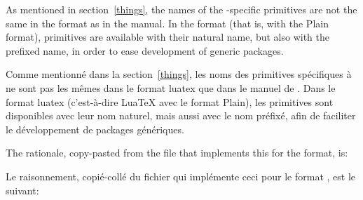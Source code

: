 \documentclass{lltxdoc}
\begin{document}
{
As mentioned in section~\ref{things}, the names of the \luatex-specific
primitives are not the same in the  format as in the \luatex
manual. In the  format (that is, \luatex with the Plain format),
primitives are available with their natural name, but also with the prefixed
name, in order to ease development of generic packages.

Comme mentionné dans la section~\ref{things}, les noms des primitives spécifiques à \luatex ne sont pas les mêmes dans le format luatex que dans le manuel de \luatex. Dans le format luatex (c'est-à-dire LuaTeX avec le format Plain), les primitives sont disponibles avec leur nom naturel, mais aussi avec le nom préfixé, afin de faciliter le développement de packages génériques.

The rationale, copy-pasted from the file  that
implements this for the  format, is:

Le raisonnement, copié-collé du fichier  qui implémente ceci pour le format , est le suivant:

}
\end{document}
